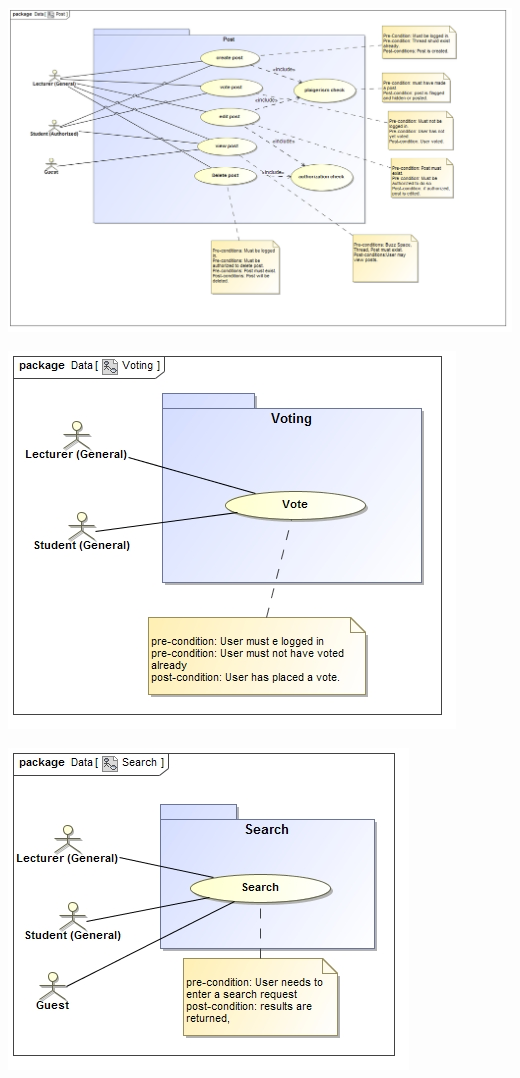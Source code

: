 \documentclass[12pt, oneside]{article}
\begin{document}
\begin{center}
			 \includegraphics[scale=0.5]{Post} 
			 
			 \includegraphics[scale=0.8]{Voting}
			 
			 \includegraphics[scale=0.8]{Search}
			 

\end{center}
\end{document}
